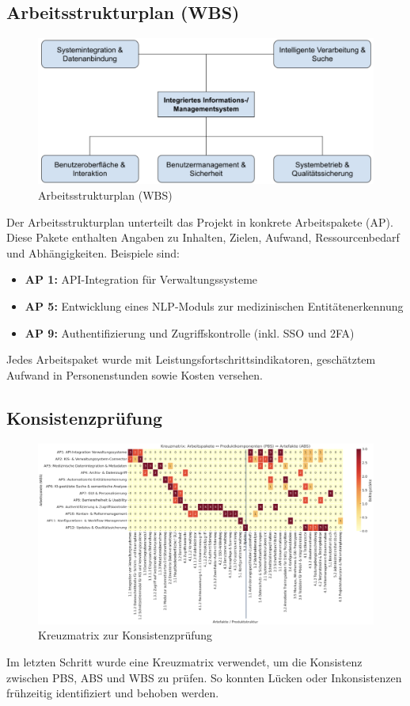 \subsection{Arbeitsstrukturplan (WBS)}
\begin{figure}[ht]
	\centering
	\includegraphics[width=1\textwidth]{fig/wbs.png}
	\caption{Arbeitsstrukturplan (WBS)}
	\label{fig:arbeitsstrukturplan}
\end{figure}
Der Arbeitsstrukturplan unterteilt das Projekt in konkrete Arbeitspakete (AP). Diese Pakete enthalten Angaben zu Inhalten, Zielen, Aufwand, Ressourcenbedarf und Abhängigkeiten. Beispiele sind:
\begin{itemize}
	\item \textbf{AP 1:} API-Integration für Verwaltungssysteme
	\item \textbf{AP 5:} Entwicklung eines NLP-Moduls zur medizinischen Entitätenerkennung
	\item \textbf{AP 9:} Authentifizierung und Zugriffskontrolle (inkl. SSO und 2FA)
\end{itemize}
Jedes Arbeitspaket wurde mit Leistungsfortschrittsindikatoren, geschätztem Aufwand in Personenstunden sowie Kosten versehen.

\subsection{Konsistenzprüfung}
\begin{figure}[ht]
	\centering
	\includegraphics[width=1\textwidth]{fig/kreuzmatrix.png}
	\caption{Kreuzmatrix zur Konsistenzprüfung}
	\label{fig:kreuzmatrix}
\end{figure}
Im letzten Schritt wurde eine Kreuzmatrix verwendet, um die Konsistenz zwischen PBS, ABS und WBS zu prüfen. So konnten Lücken oder Inkonsistenzen frühzeitig identifiziert und behoben werden.

